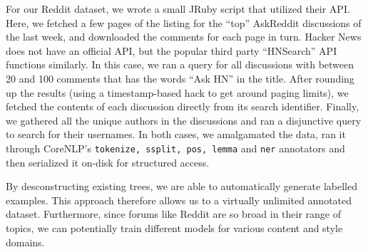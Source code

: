 \documentclass{article}
\begin{document}
For our Reddit dataset, we wrote a small JRuby script that utilized their API.
Here, we fetched a few pages of the listing for the ``top'' AskReddit
discussions of the last week, and downloaded the comments for each page in
turn. Hacker News does not have an official API, but the popular third party
``HNSearch'' API functions similarly. In this case, we ran a query for all
discussions with between 20 and 100 comments that has the words ``Ask HN'' in
the title. After rounding up the results (using a timestamp-based hack to get
around paging limits), we fetched the contents of each discussion directly
from its search identifier. Finally, we gathered all the unique authors in the
discussions and ran a disjunctive query to search for their usernames. In both
cases, we amalgamated the data, ran it through CoreNLP's \texttt{tokenize,
ssplit, pos, lemma} and \texttt{ner} annotators and then serialized it on-disk
for structured access.

By desconstructing existing trees, we are able to automatically generate
labelled examples. This approach therefore allows us to a virtually unlimited
annotated dataset. Furthermore, since forums like Reddit are so broad in their
range of topics, we can potentially train different models for various content
and style domains.
\end{document}
